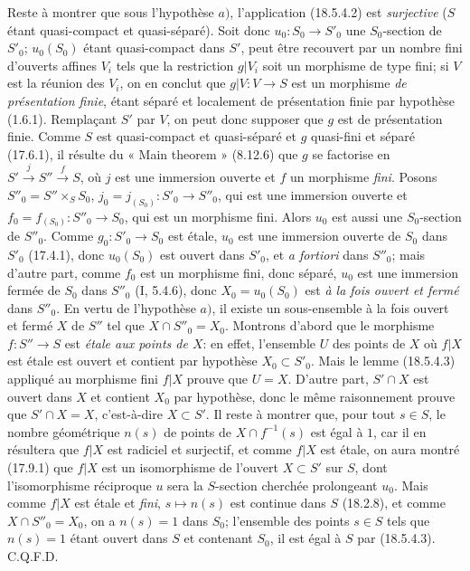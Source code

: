 Reste à montrer que sous l'hypothèse $a)$, l'application (18.5.4.2) est \emph{surjective} ($S$ étant quasi-compact et quasi-séparé). Soit donc $u_0:S_0\to S'_0$ une $S_0$-section de $S'_0$; $u_0(S_0)$ étant quasi-compact dans $S'$, peut être recouvert par un nombre fini d'ouverts affines $V_i$ tels que la restriction $g|V_i$ soit un morphisme de type fini; si $V$ est la réunion des $V_i$, on en conclut que $g|V:V\to S$ est un morphisme \emph{de présentation finie}, étant séparé et localement de présentation finie par hypothèse (1.6.1). Remplaçant $S'$ par $V$, on peut donc supposer que $g$ est de présentation finie. Comme $S$ est quasi-compact et quasi-séparé et $g$ quasi-fini et séparé (17.6.1), il résulte du « Main theorem » (8.12.6) que $g$ se factorise en $S'\xrightarrow{j}S''\xrightarrow{f}S$, où $j$ est une immersion ouverte et $f$ un morphisme \emph{fini}. Posons $S''_0=S''\times_S S_0$, $j_0=j_{(S_0)}:S'_0\to S''_0$, qui est une immersion ouverte et $f_0=f_{(S_0)}:S''_0\to S_0$, qui est un morphisme fini. Alors $u_0$ est aussi une $S_0$-section de $S''_0$. Comme $g_0:S'_0\to S_0$ est étale, $u_0$ est une immersion ouverte de $S_0$ dans $S'_0$ (17.4.1), donc $u_0(S_0)$ est ouvert dans $S'_0$, et \emph{a fortiori} dans $S''_0$; mais d'autre part, comme $f_0$ est un morphisme fini, donc séparé, $u_0$ est une immersion fermée de $S_0$ dans $S''_0$ (I, 5.4.6), donc $X_0=u_0(S_0)$ est \emph{à la fois ouvert et fermé} dans $S''_0$. En vertu de l'hypothèse $a)$, il existe un sous-ensemble à la fois ouvert et fermé $X$ de $S''$ tel que $X\cap S''_0=X_0$. Montrons d'abord que le morphisme $f:S''\to S$ est \emph{étale aux points de $X$}: en effet, l'ensemble $U$ des points de $X$ où $f|X$ est étale est ouvert et contient par hypothèse $X_0\subset S'_0$. Mais le lemme (18.5.4.3) appliqué au morphisme fini $f|X$ prouve que $U=X$. D'autre part, $S'\cap X$ est ouvert dans $X$ et contient $X_0$ par hypothèse, donc le même raisonnement prouve que $S'\cap X=X$, c'est-à-dire $X\subset S'$. Il reste à montrer que, pour tout $s\in S$, le nombre géométrique $n(s)$ de points de $X\cap f^{-1}(s)$ est égal à $1$, car il en résultera que $f|X$ est radiciel et surjectif, et comme $f|X$ est étale, on aura montré (17.9.1) que $f|X$ est un isomorphisme de l'ouvert $X\subset S'$ sur $S$, dont l'isomorphisme réciproque $u$ sera la $S$-section cherchée prolongeant $u_0$. Mais comme $f|X$ est étale et \emph{fini}, $s\mapsto n(s)$ est continue dans $S$ (18.2.8), et comme $X\cap S''_0=X_0$, on a $n(s)=1$ dans $S_0$; l'ensemble des points $s\in S$ tels que $n(s)=1$ étant ouvert dans $S$ et contenant $S_0$, il est égal à $S$ par (18.5.4.3). C.Q.F.D.

